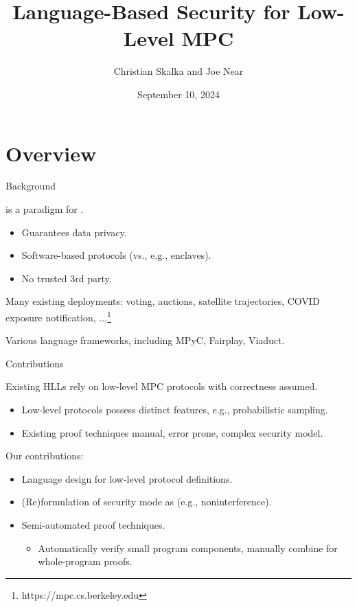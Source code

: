 \documentclass{beamer}
\title{Language-Based Security for Low-Level MPC}
\author{Christian Skalka and Joe Near}
\date{September 10, 2024}
\begin{document}
\begin{frame}
    \titlepage 
\end{frame}

\logo{}



\section{Overview}

\begin{frame}{Background}
  
   is a paradigm for
  .
  \begin{itemize}
  \item Guarantees data privacy.
  \item Software-based protocols (vs., e.g., enclaves).
  \item No trusted 3rd party.
  \end{itemize}
  Many existing deployments: voting, auctions, satellite trajectories, COVID exposure notification, ...\footnote{https://mpc.cs.berkeley.edu}

  \medskip

  Various language frameworks, including MPyC, Fairplay, Viaduct.
\end{frame}

\begin{frame}{Contributions}

  Existing HLLs rely on low-level MPC protocols with correctness
  assumed.
  \begin{itemize}
  \item Low-level protocols possess distinct features, e.g., probabilistic sampling.
  \item Existing proof techniques manual, error prone, complex security model.
  \end{itemize}
  Our contributions:
  \begin{itemize}
  \item Language design for low-level protocol definitions.
  \item (Re)formulation of security mode as  (e.g., noninterference).
  \item Semi-automated proof techniques.
    \begin{itemize}
    \item Automatically verify small program components, manually combine for whole-program proofs. 
    \end{itemize}
  \end{itemize}
  
\end{frame}
\end{document}
